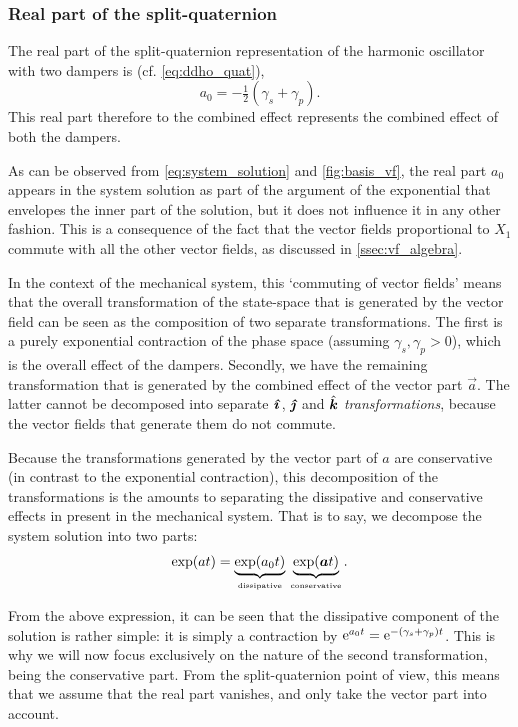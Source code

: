 \subsubsection{Real part of the split-quaternion} 
The real part of the split-quaternion representation of the harmonic oscillator with two dampers is (cf. \cref{eq:ddho_quat}),
\begin{equation}
     a_0 = -\tfrac{1}{2}(\gamma_s + \gamma_p).
\end{equation}
This real part therefore to the combined effect represents the combined effect of both the dampers.

As can be observed from \cref{eq:system_solution} and \cref{fig:basis_vf}, the real part \(a_0\) appears in the system solution as part of the argument of the exponential that envelopes the inner part of the solution, but it does not influence it in any other fashion. This is a consequence of the fact that the vector fields proportional to \(X_1\) commute with all the other vector fields, as discussed in \cref{ssec:vf_algebra}. 

In the context of the mechanical system, this `commuting of vector fields' means that the overall transformation of the state-space that is generated by the vector field can be seen as the composition of two separate transformations. The first is a purely exponential contraction of the phase space (assuming \(\gamma_s, \gamma_p > 0\)), which is the overall effect of the dampers. Secondly, we have the remaining transformation that is generated by the combined effect of the vector part \(\vec{a}\). The latter cannot be decomposed into separate \(\quati\), \(\quatj\) and \(\quatk\) \emph{transformations}, because the vector fields that generate them do not commute.

Because the transformations generated by the vector part of \(a\) are conservative (in contrast to the exponential contraction), this decomposition of the transformations is the amounts to separating the dissipative and conservative effects in present in the mechanical system. That is to say, we decompose the system solution into two parts:
\begin{equation}
     \exp(a t) = \underbrace{\exp(a_0 t)}_{\text{\tiny dissipative}} \: \underbrace{\exp(\vec{a} t)}_{\text{\tiny conservative}}.
\end{equation}

From the above expression, it can be seen that the dissipative component of the solution is rather simple: it is simply a contraction by \(\ec^{a_0t } = \ec^{-(\gamma_s + \gamma_p)t}\). This is why we will now focus exclusively on the nature of the second transformation, being the conservative part. From the split-quaternion point of view, this means that we assume that the real part vanishes, and only take the vector part into account.

